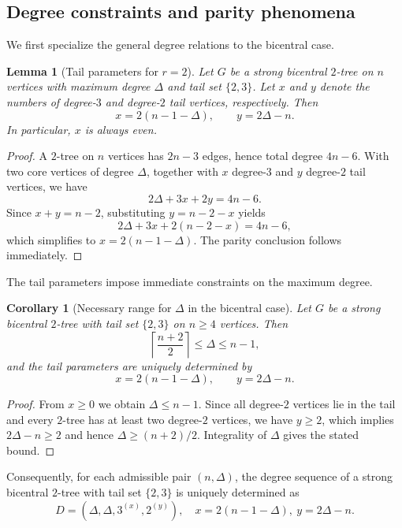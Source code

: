 \documentclass[12pt]{article}
\newtheorem{lemma}[theorem]{Lemma}
\newtheorem{corollary}[theorem]{Corollary}
\numberwithin{equation}{section}
\begin{document}
\subsection{Degree constraints and parity phenomena}

We first specialize the general degree relations to the bicentral case.

\begin{lemma}[Tail parameters for $r=2$]
\label{lem:r2-xy}
Let $G$ be a strong bicentral $2$-tree on $n$ vertices with maximum degree
$\Delta$ and tail set $\{2,3\}$.
Let $x$ and $y$ denote the numbers of degree-$3$ and degree-$2$ tail vertices,
respectively.
Then
\begin{equation}\label{eq:r2-xy}
x = 2(n-1-\Delta), \qquad y = 2\Delta - n.
\end{equation}
In particular, $x$ is always even.
\end{lemma}

\begin{proof}
A $2$-tree on $n$ vertices has $2n-3$ edges, hence total degree $4n-6$.
With two core vertices of degree $\Delta$, together with $x$ degree-$3$ and
$y$ degree-$2$ tail vertices, we have
\[
2\Delta + 3x + 2y = 4n - 6.
\]
Since $x+y=n-2$, substituting $y=n-2-x$ yields
\[
2\Delta + 3x + 2(n-2-x) = 4n-6,
\]
which simplifies to $x=2(n-1-\Delta)$.
The parity conclusion follows immediately.
\end{proof}

The tail parameters impose immediate constraints on the maximum degree.

\begin{corollary}[Necessary range for $\Delta$ in the bicentral case]
\label{cor:r2-delta-range}
Let $G$ be a strong bicentral $2$-tree with tail set $\{2,3\}$ on $n\ge 4$
vertices.
Then
\[
\left\lceil\frac{n+2}{2}\right\rceil \le \Delta \le n-1,
\]
and the tail parameters are uniquely determined by
\[
x=2(n-1-\Delta), \qquad y=2\Delta-n.
\]
\end{corollary}

\begin{proof}
From $x\ge 0$ we obtain $\Delta\le n-1$.
Since all degree-$2$ vertices lie in the tail and every $2$-tree has at least two
degree-$2$ vertices, we have $y\ge 2$, which implies $2\Delta-n\ge 2$ and hence
$\Delta\ge (n+2)/2$.
Integrality of $\Delta$ gives the stated bound.
\end{proof}

Consequently, for each admissible pair $(n,\Delta)$, the degree sequence of a
strong bicentral $2$-tree with tail set $\{2,3\}$ is uniquely determined as
\[
D=(\Delta,\Delta,3^{(x)},2^{(y)}),
\quad
x=2(n-1-\Delta),\ y=2\Delta-n.
\]
\end{document}
